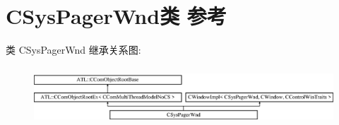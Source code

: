 \hypertarget{class_c_sys_pager_wnd}{}\section{C\+Sys\+Pager\+Wnd类 参考}
\label{class_c_sys_pager_wnd}
类 C\+Sys\+Pager\+Wnd 继承关系图\+:\begin{figure}[H]
\begin{center}
\leavevmode
\includegraphics[height=2.204725cm]{class_c_sys_pager_wnd}
\end{center}
\end{figure}
